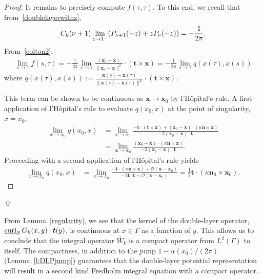 \begin{proof}
It remains to precisely compute $f(\tau,\tau)$. To this end, we recall
that from~\eqref{doublelayerwithz},
\begin{align*}
  C_k(\nu+1)\lim_{z\rightarrow 1^-} 
    (P_{\nu+1}(-z)+zP_{\nu}(-z)) = -\frac{1}{2\pi}.
\end{align*}
From~\eqref{colton2}, 
\begin{align*}
  \lim_{s\rightarrow \tau}f(s,\tau) = -\frac{1}{2\pi} \lim_{s\rightarrow \tau}
  \frac{(\mathbf{x}_{0}-\mathbf{x})}{\|\mathbf{x}_{0}-\mathbf{x}\|^2} \cdot
  \left(\mathbf{t} \times \mathbf{x} \right) =
  -\frac{1}{2\pi}\lim_{s\rightarrow \tau}q(x(\tau),x(s))
\end{align*}
where
$q(x(\tau),x(s)):=\frac{\mathbf{x}(s)-\mathbf{x}(\tau)}{\|\mathbf{x}(s)-\mathbf{x}(\tau)\|^2}
\cdot \left(\mathbf{t} \times \mathbf{x} \right).$ 

This term can be shown to be continuous as $\mathbf{x} \rightarrow
\mathbf{x}_{0}$ by l'H\^{o}pital's rule.  A first application of
l'H\^{o}pital's rule to evaluate $q(x_{0},x)$ at the point of
singularity, $x = x_{0}$, 
\begin{align*}
  \lim_{x \rightarrow x_{0}}q(x_{0},x) & = 
  \lim_{x \rightarrow x_{0}} 
  \frac{ -\mathbf{t} \cdot \left(\mathbf{t} \times \mathbf{x} \right)
  + (\mathbf{x}_{0}-\mathbf{x}) \cdot \left( \kappa \mathbf{n}
  \times \mathbf{x} \right)}
  {-2(\mathbf{x}_{0} - \mathbf{x}) \cdot \mathbf{t}} \\
  & = \lim_{\mathbf{x} \rightarrow \mathbf{x}_{0}} 
  \frac{(\mathbf{x}_{0}-\mathbf{x}) \cdot \left(
  \kappa\mathbf{n} \times \mathbf{x}\right)}
  {-2(\mathbf{x}_{0} - \mathbf{x}) \cdot \mathbf{t}}. 
\end{align*}
Proceeding with a second application of l'H\^{o}pital's rule yields
\begin{align*}
  \lim_{x \rightarrow x_{0}} q(x_{0},x)  
  & = \lim_{x \rightarrow x_{0}} \frac{-\mathbf{t} \cdot 
  \left( \kappa \mathbf{n} \times \mathbf{x} \right) +
  \mathcal{O}(\mathbf{x} - \mathbf{x}_{0})}
  {-2\mathbf{t} \cdot \mathbf{t} + \mathcal{O}(\mathbf{x}-\mathbf{x}_{0})}
  = \frac{1}{2} \mathbf{t} \cdot \left( \kappa \mathbf{n}_{0} \times 
  \mathbf{x}_{0} \right).
\end{align*}

\end{proof}
\qed

From Lemma~\ref{regularity}, we see that the kernel of the double-layer
operator, $\underline{\mbox{curl}}_{\S}\, G_{k}(x,y)\cdot\vec{t}(y)$,
is continuous at $x \in \Gamma$ as a function of $y$.  This allows us
to conclude that the integral operator $\widetilde{W_k}$ is a compact
operator from $L^{2}(\Gamma)$ to itself.  The compactness, in addition
to the jump $1-\alpha(x_0)/(2\pi)$ (Lemma~\ref{l:DLPjump}) guarantees
that the double-layer potential representation will result in a second
kind Fredholm integral equation with a compact operator.

